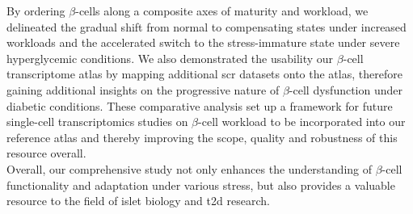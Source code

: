 By ordering $\beta$-cells along a composite axes of maturity and workload, we delineated the gradual shift from normal to compensating states under increased workloads and the accelerated switch to the stress-immature state under severe hyperglycemic conditions. We also demonstrated the usability our $\beta$-cell transcriptome atlas by mapping additional \gls{scr} datasets onto the atlas, therefore gaining additional insights on the progressive nature of $\beta$-cell dysfunction under diabetic conditions. These comparative analysis set up a framework for future single-cell transcriptomics studies on $\beta$-cell workload to be incorporated into our reference atlas and thereby improving the scope, quality and robustness of this resource overall.\\

Overall, our comprehensive study not only enhances the understanding of $\beta$-cell functionality and adaptation under various stress, but also provides a valuable resource to the field of islet biology and \gls{t2d} research.

